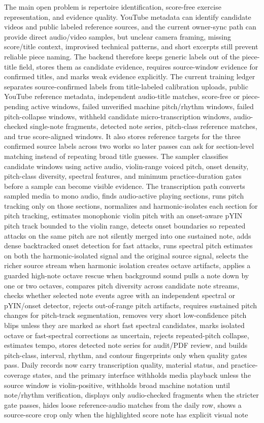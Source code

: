 \documentclass[12pt,letterpaper]{article}
\begin{document}
The main open problem is repertoire identification, score-free exercise representation, and evidence quality. YouTube metadata can identify candidate videos and public labeled reference sources, and the current owner-sync path can provide direct audio/video samples, but unclear camera framing, missing score/title context, improvised technical patterns, and short excerpts still prevent reliable piece naming. The backend therefore keeps generic labels out of the piece-title field, stores them as candidate evidence, requires source-window evidence for confirmed titles, and marks weak evidence explicitly. The current training ledger separates source-confirmed labels from title-labeled calibration uploads, public YouTube reference metadata, independent audio-title matches, score-free or piece-pending active windows, failed unverified machine pitch/rhythm windows, failed pitch-collapse windows, withheld candidate micro-transcription windows, audio-checked single-note fragments, detected note series, pitch-class reference matches, and true score-aligned windows. It also stores reference targets for the three confirmed source labels across two works so later passes can ask for section-level matching instead of repeating broad title guesses. The sampler classifies candidate windows using active audio, violin-range voiced pitch, onset density, pitch-class diversity, spectral features, and minimum practice-duration gates before a sample can become visible evidence. The transcription path converts sampled media to mono audio, finds audio-active playing sections, runs pitch tracking only on those sections, normalizes and harmonic-isolates each section for pitch tracking, estimates monophonic violin pitch with an onset-aware pYIN pitch track bounded to the violin range, detects onset boundaries so repeated attacks on the same pitch are not silently merged into one sustained note, adds dense backtracked onset detection for fast attacks, runs spectral pitch estimates on both the harmonic-isolated signal and the original source signal, selects the richer source stream when harmonic isolation creates octave artifacts, applies a guarded high-note octave rescue when background sound pulls a note down by one or two octaves, compares pitch diversity across candidate note streams, checks whether selected note events agree with an independent spectral or pYIN/onset detector, rejects out-of-range pitch artifacts, requires sustained pitch changes for pitch-track segmentation, removes very short low-confidence pitch blips unless they are marked as short fast spectral candidates, marks isolated octave or fast-spectral corrections as uncertain, rejects repeated-pitch collapse, estimates tempo, stores detected note series for audit/PDF review, and builds pitch-class, interval, rhythm, and contour fingerprints only when quality gates pass. Daily records now carry transcription quality, material status, and practice-coverage states, and the primary interface withholds media playback unless the source window is violin-positive, withholds broad machine notation until note/rhythm verification, displays only audio-checked fragments when the stricter gate passes, hides loose reference-audio matches from the daily row, shows a source-score crop only when the highlighted score note has explicit visual note 
\end{document}
